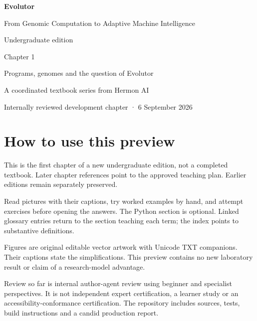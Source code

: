 \documentclass[11pt,oneside,openany]{book}
\begin{document}
\frontmatter
\begin{titlepage}
\color{BookBlue}\sffamily
\vspace*{20mm}
{\Huge\bfseries Evolutor\par}
\vspace{8mm}
{\Large From Genomic Computation to Adaptive Machine Intelligence\par}
\vspace{20mm}
{\large Undergraduate edition\par}
{\LARGE Chapter 1\par}
\vspace{10mm}
{\large Programs, genomes and the question of Evolutor\par}
\vfill
{\normalsize A coordinated textbook series from Hermon AI\par}
\vspace{5mm}
{\small Internally reviewed development chapter · 6 September 2026\par}
\end{titlepage}
\chapter*{How to use this preview}
This is the first chapter of a new undergraduate edition, not a completed textbook. Later chapter references point to the approved teaching plan. Earlier editions remain separately preserved.

Read pictures with their captions, try worked examples by hand, and attempt exercises before opening the answers. The Python section is optional. Linked glossary entries return to the section teaching each term; the index points to substantive definitions.

Figures are original editable vector artwork with Unicode TXT companions. Their captions state the simplifications. This preview contains no new laboratory result or claim of a research-model advantage.

Review so far is internal author-agent review using beginner and specialist perspectives. It is not independent expert certification, a learner study or an accessibility-conformance certification. The repository includes sources, tests, build instructions and a candid production report.
\tableofcontents
\mainmatter

\backmatter
\printnoidxglossary[title={Chapter 1 glossary},style=altlist,nonumberlist]

\clearpage
{}
{}
\printindex
\end{document}

